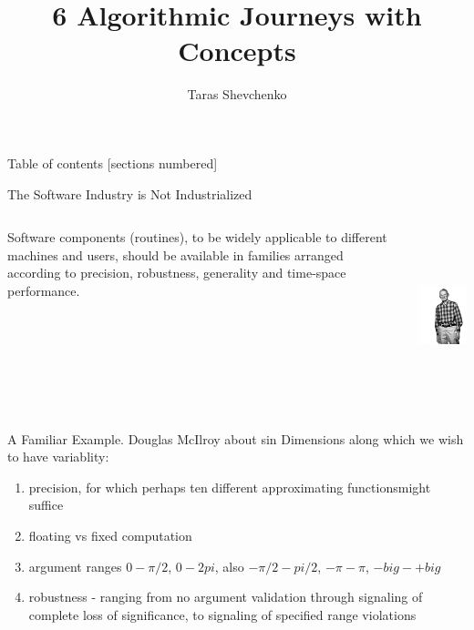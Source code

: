 \documentclass[10pt]{beamer}
\title{6 Algorithmic Journeys with Concepts}
\date{}
\author{Taras Shevchenko}
\institute{Rails Reactor / Giphy}
\begin{document}
\maketitle

\begin{frame}{Table of contents}
  [sections numbered]
  \tableofcontents[hideallsubsections]
\end{frame}


\begin{frame}{The Software Industry is Not Industrialized}
    \begin{columns}
        \begin{column}{0.6\textwidth}
			Software components (routines), to be widely applicable to
			different machines and users, should be available in families arranged
			according to precision, robustness, generality and time-space performance.
        \end{column}
        \begin{column}{0.4\textwidth}  %
                \begin{center}
					\includegraphics[height=5cm]{images/doug_mcilroy.jpg}
                \end{center}
        \end{column}
    \end{columns}
\end{frame}

\begin{frame}{A Familiar Example. Douglas McIlroy about sin}
Dimensions along which we wish to have variablity:
\begin{enumerate}
    \item precision, for which perhaps ten different approximating functionsmight suffice
    \item floating vs fixed computation
    \item argument ranges $0 - \pi/2$, $0-2pi$, also $-\pi/2 - pi/2$, $-\pi - \pi$, $-big - +big$
    \item robustness - ranging from no argument validation through signaling of complete loss of significance, to signaling of specified range violations
\end{enumerate}

\end{frame}
\end{document}
